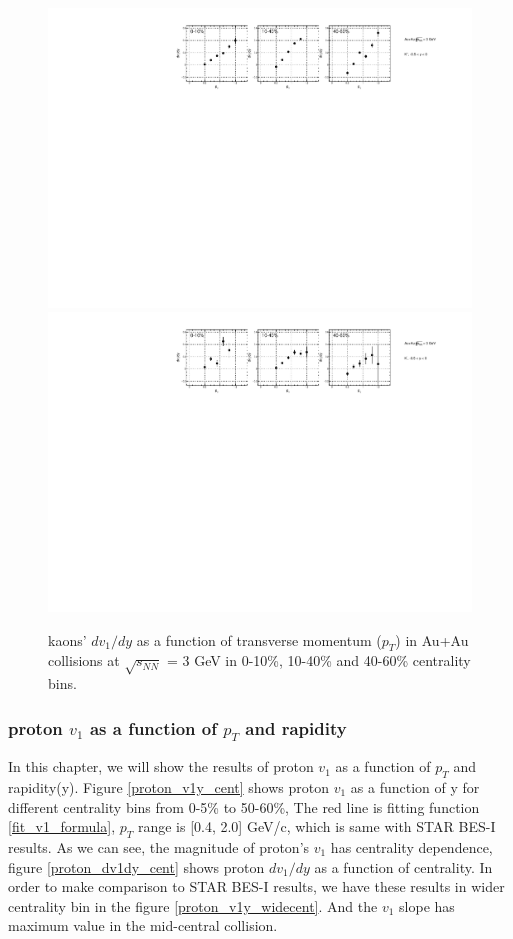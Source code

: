 \begin{figure}[h]
\includegraphics[scale=0.5]{FXT3gev/chapter3/fig/v1ptpikp/kap_dv1pt_widecent.pdf}
\includegraphics[scale=0.5]{FXT3gev/chapter3/fig/v1ptpikp/kam_dv1pt_widecent.pdf}
\caption{kaons' $dv_{1}/dy$ as a function of transverse momentum ($p_{T}$) in Au+Au collisions at $\sqrt{s_{NN}}$ = 3 GeV in 0-10\%, 10-40\% and 40-60\% centrality bins.}
\label{kaon_dv1pt_widecent}
\end{figure}

\clearpage

\subsubsection{proton $v_{1}$ as a function of $p_{T}$ and rapidity}
In this chapter, we will show the results of proton $v_{1}$ as a function of $p_{T}$ and rapidity(y). 
Figure \ref{proton_v1y_cent} shows proton $v_{1}$ as a function of y for different centrality bins from 0-5\% to 50-60\%, The red line is fitting function \ref{fit_v1_formula}, $p_{T}$ range is [0.4, 2.0] GeV/c, which is same with STAR BES-I results. As we can see, the magnitude of proton's $v_{1}$ has centrality dependence, figure \ref{proton_dv1dy_cent} shows proton $dv_{1}/dy$ as a function of centrality. In order to make comparison to STAR BES-I results, we have these results in wider centrality bin in the figure \ref{proton_v1y_widecent}. And the $v_{1}$ slope has maximum value in the mid-central collision.



